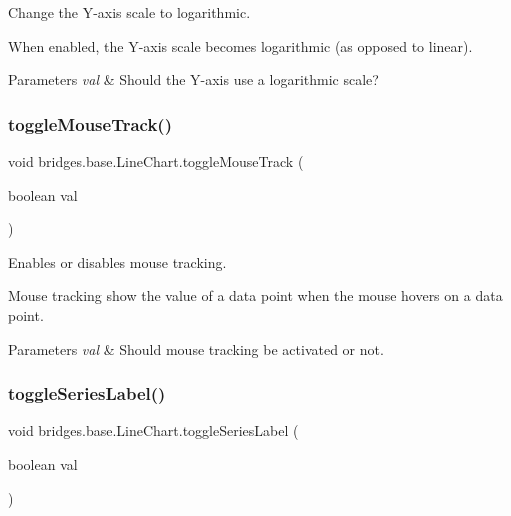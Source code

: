 Change the Y-\/axis scale to logarithmic. 

When enabled, the Y-\/axis scale becomes logarithmic (as opposed to linear).


\begin{DoxyParams}{Parameters}
{\em val} & Should the Y-\/axis use a logarithmic scale? \\
\hline
\end{DoxyParams}
\mbox{\label{classbridges_1_1base_1_1_line_chart_a095d16c1544cf373b8d2bf68ca864bd9}} 
\subsubsection{\texorpdfstring{toggle\+Mouse\+Track()}{toggleMouseTrack()}}
{\footnotesize\ttfamily void bridges.\+base.\+Line\+Chart.\+toggle\+Mouse\+Track (\begin{DoxyParamCaption}\item[{boolean}]{val }\end{DoxyParamCaption})}



Enables or disables mouse tracking. 

Mouse tracking show the value of a data point when the mouse hovers on a data point.


\begin{DoxyParams}{Parameters}
{\em val} & Should mouse tracking be activated or not. \\
\hline
\end{DoxyParams}
\mbox{\label{classbridges_1_1base_1_1_line_chart_adae74cfb09585727a96cf74ddf74d098}} 
\subsubsection{\texorpdfstring{toggle\+Series\+Label()}{toggleSeriesLabel()}}
{\footnotesize\ttfamily void bridges.\+base.\+Line\+Chart.\+toggle\+Series\+Label (\begin{DoxyParamCaption}\item[{boolean}]{val }\end{DoxyParamCaption})}



